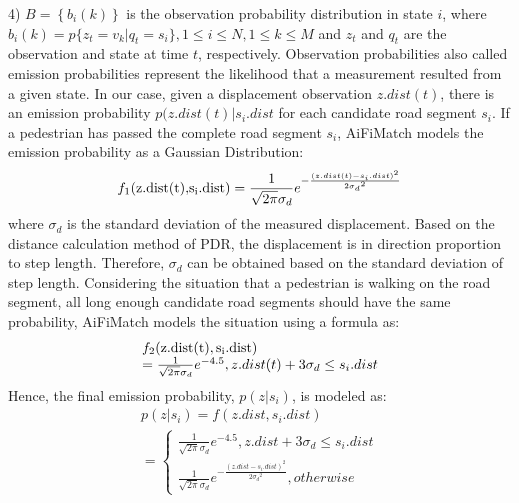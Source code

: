 \documentclass[conference]{IEEEtran}
\begin{document}
4) $B = \left\{ {{b_i}(k)} \right\}$ is the observation probability distribution in state $i$, where ${b_i}(k) = p\{ {z_t} = {v_k}|{q_t} = {s_i}\},1 \le i \le N,1 \le k \le M$ and $z_t$ and $q_t$ are the observation and state at time $t$, respectively. Observation probabilities also called emission probabilities represent the likelihood that a measurement resulted from a given state. In our case, given a displacement observation $z.dist(t)$, there is an emission probability $p(z.dist(t)|{s_i}.dist$ for each candidate road segment $s_i$. If a pedestrian has passed the complete road segment $s_i$, AiFiMatch models the emission probability as a Gaussian Distribution:
\begin{equation}
\label{equ_emission1}
{f_1}({\rm{z}}{\rm{.dist(t),}}{{\rm{s}}_{\rm{i}}}{\rm{.dist}}) = \frac{1}{{\sqrt {2\pi } {\sigma _d}}}{e^{ - \frac{{{{(z.dist(t) - {s_i}.dist)}^2}}}{{2{\sigma _d}^2}}}}
\end{equation}
where $\sigma _d$ is the standard deviation of the measured displacement. Based on the distance calculation method of PDR, the displacement is in direction proportion to step length. Therefore, $\sigma _d$ can be obtained based on the standard deviation of step length. Considering the situation that a pedestrian is walking on the road segment, all long enough candidate road segments should have the same probability, AiFiMatch models the situation using a formula as:
\begin{equation}
\begin{array}{l}
{f_2}({\rm{z}}.{\rm{dist}}({\rm{t}}),{{\rm{s}}_{\rm{i}}}.{\rm{dist}})\\
= \frac{1}{{\sqrt {2\pi } {\sigma _d}}}{e^{ - 4.5}},z.dist(t) + 3{\sigma _d} \le {s_i}.dist
\end{array}
\end{equation}
Hence, the final emission probability, $p(z|s_i)$, is modeled as:
\begin{equation}
\begin{array}{l}
p(z|{s_i}) = f(z.dist,{s_i}.dist)\\
= \left\{ {\begin{array}{*{20}{l}}
	{\frac{1}{{\sqrt {2\pi } {\sigma _d}}}{e^{ - 4.5}},z.dist + 3{\sigma _d} \le {s_i}.dist}\\
	{\frac{1}{{\sqrt {2\pi } {\sigma _d}}}{e^{ - \frac{{{{(z.dist - {s_i}.dist)}^2}}}{{2{\sigma _d}^2}}}},otherwise}
	\end{array}} \right.
\end{array}
\end{equation}
\end{document}
